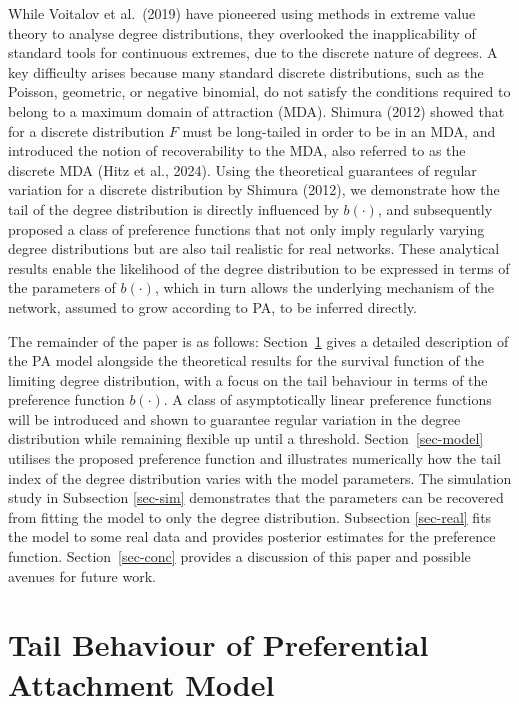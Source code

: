 \documentclass[
  sn-basic,
  10pt,
]{sn-jnl}
\theoremstyle{plain}
\theoremstyle{plain}
\theoremstyle{remark}
\begin{document}
While Voitalov et al.~(2019) have pioneered using methods in extreme
value theory to analyse degree distributions, they overlooked the
inapplicability of standard tools for continuous extremes, due to the
discrete nature of degrees. A key difficulty arises because many
standard discrete distributions, such as the Poisson, geometric, or
negative binomial, do not satisfy the conditions required to belong to a
maximum domain of attraction (MDA). Shimura (2012) showed that for a
discrete distribution \(F\) must be long-tailed in order to be in an
MDA, and introduced the notion of recoverability to the MDA, also
referred to as the discrete MDA (Hitz et al., 2024). Using the
theoretical guarantees of regular variation for a discrete distribution
by Shimura (2012), we demonstrate how the tail of the degree
distribution is directly influenced by \(b(\cdot)\), and subsequently
proposed a class of preference functions that not only imply regularly
varying degree distributions but are also tail realistic for real
networks. These analytical results enable the likelihood of the degree
distribution to be expressed in terms of the parameters of \(b(\cdot)\),
which in turn allows the underlying mechanism of the network, assumed to
grow according to PA, to be inferred directly.

The remainder of the paper is as follows: Section~\ref{sec-tail} gives a
detailed description of the PA model alongside the theoretical results
for the survival function of the limiting degree distribution, with a
focus on the tail behaviour in terms of the preference function
\(b(\cdot)\). A class of asymptotically linear preference functions will
be introduced and shown to guarantee regular variation in the degree
distribution while remaining flexible up until a threshold.
Section~\ref{sec-model} utilises the proposed preference function and
illustrates numerically how the tail index of the degree distribution
varies with the model parameters. The simulation study in Subsection
\ref{sec-sim} demonstrates that the parameters can be recovered from
fitting the model to only the degree distribution. Subsection
\ref{sec-real} fits the model to some real data and provides posterior
estimates for the preference function. Section~\ref{sec-conc} provides a
discussion of this paper and possible avenues for future work.

\section{Tail Behaviour of Preferential Attachment
Model}\label{sec-tail}
\end{document}
